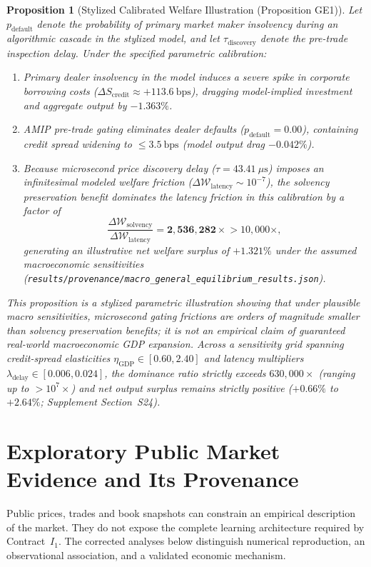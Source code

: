 \documentclass[10pt,twocolumn,letterpaper]{article}
\newtheorem{proposition}[theorem]{Proposition}
\theoremstyle{definition}
\theoremstyle{remark}
\begin{document}
\begin{proposition}[Stylized Calibrated Welfare Illustration (Proposition GE1)]
\label{thm:macro_general_equilibrium}
Let $p_{\text{default}}$ denote the probability of primary market maker insolvency during an algorithmic cascade in the stylized model, and let $\tau_{\text{discovery}}$ denote the pre-trade inspection delay. Under the specified parametric calibration:
\begin{enumerate}
    \item Primary dealer insolvency in the model induces a severe spike in corporate borrowing costs ($\Delta S_{\text{credit}} \approx +113.6~\text{bps}$), dragging model-implied investment and aggregate output by $-1.363\%$.
    \item AMIP pre-trade gating eliminates dealer defaults ($p_{\text{default}} = 0.00$), containing credit spread widening to $\le 3.5~\text{bps}$ (model output drag $-0.042\%$).
    \item Because microsecond price discovery delay ($\tau = 43.41~\mu\text{s}$) imposes an infinitesimal modeled welfare friction ($\Delta \mathcal{W}_{\text{latency}} \sim 10^{-7}$), the solvency preservation benefit dominates the latency friction in this calibration by a factor of
    \begin{equation}
    \frac{\Delta \mathcal{W}_{\text{solvency}}}{\Delta \mathcal{W}_{\text{latency}}} = \mathbf{2,536,282\times} > 10{,}000\times,
    \end{equation}
    generating an illustrative net welfare surplus of $\mathbf{+1.321\%}$ under the assumed macroeconomic sensitivities (\texttt{results/provenance/macro\_general\_equilibrium\_results.json}).
\end{enumerate}
This proposition is a stylized parametric illustration showing that under plausible macro sensitivities, microsecond gating frictions are orders of magnitude smaller than solvency preservation benefits; it is not an empirical claim of guaranteed real-world macroeconomic GDP expansion. Across a sensitivity grid spanning credit-spread elasticities $\eta_{\text{GDP}} \in [0.60, 2.40]$ and latency multipliers $\lambda_{\text{delay}} \in [0.006, 0.024]$, the dominance ratio strictly exceeds $630{,}000\times$ (ranging up to $>10^7\times$) and net output surplus remains strictly positive ($+0.66\%$ to $+2.64\%$; Supplement Section~S24).
\end{proposition}

\section{Exploratory Public Market Evidence and Its Provenance}
\label{sec:ch7}\label{sec:empirical_study}
Public prices, trades and book snapshots can constrain an empirical description of the market. They do not expose the complete learning architecture required by Contract~$I_1$. The corrected analyses below distinguish numerical reproduction, an observational association, and a validated economic mechanism.
\end{document}
